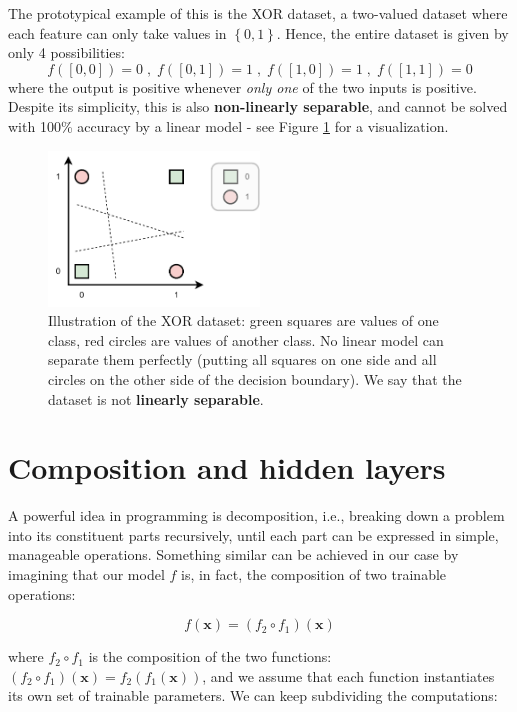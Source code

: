 The prototypical example of this is the XOR dataset, a two-valued dataset where each feature can only take values in $\left\{0, 1\right\}$. Hence, the entire dataset is given by only 4 possibilities:
%
$$
f([0,0])=0 \;,\; f([0,1])=1\;,\;f([1,0])=1\;,\;f([1,1])=0
$$
%
where the output is positive whenever \textit{only one} of the two inputs is positive. Despite its simplicity, this is also \textbf{non-linearly separable}, and cannot be solved with 100\% accuracy by a linear model - see Figure \ref{fig:xor} for a visualization.

\begin{figure}
    \centering
    \hspace{1em}\includegraphics[width=0.5\textwidth]{images/XOR.pdf}
    \caption{Illustration of the XOR dataset: green squares are values of one class, red circles are values of another class. No linear model can separate them perfectly (putting all squares on one side and all circles on the other side of the decision boundary). We say that the dataset is not \textbf{linearly separable}.}
    \label{fig:xor}
\end{figure}


\section{Composition and hidden layers}

\addclock A powerful idea in programming is decomposition, i.e., breaking down a problem into its constituent parts recursively, until each part can be expressed in simple, manageable operations. Something similar can be achieved in our case by imagining that our model $f$ is, in fact, the composition of two trainable operations:

$$
f(\mathbf{x})=(f_2 \circ f_1)(\mathbf{x})
$$

where $f_2 \circ f_1$ is the composition of the two functions: $(f_2 \circ f_1)(\mathbf{x}) = f_2(f_1(\mathbf{x}))$, and we assume that each function instantiates its own set of trainable parameters. We can keep subdividing the computations:

